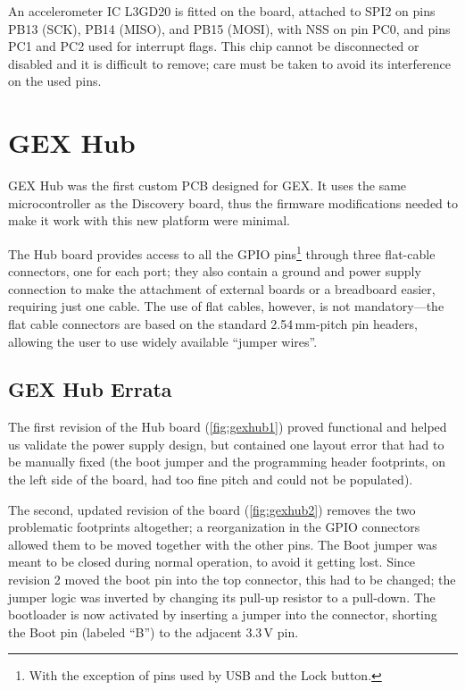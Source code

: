 An accelerometer \gls{IC} L3GD20 is fitted on the board, attached to SPI2 on pins PB13 (\gls{SCK}), PB14 (\gls{MISO}), and PB15 (\gls{MOSI}), with \gls{NSS} on pin PC0, and pins PC1 and PC2 used for interrupt flags. This chip cannot be disconnected or disabled and it is difficult to remove; care must be taken to avoid its interference on the used pins.

\section{GEX Hub}

GEX Hub was the first custom \gls{PCB} designed for GEX. It uses the same microcontroller as the Discovery board, thus the firmware modifications needed to make it work with this new platform were minimal.

The Hub board provides access to all the \gls{GPIO} pins\footnote{With the exception of pins used by USB and the Lock button.} through three flat-cable connectors, one for each port; they also contain a ground and power supply connection to make the attachment of external boards or a breadboard easier, requiring just one cable. The use of flat cables, however, is not mandatory---the flat cable connectors are based on the standard 2.54\,mm-pitch pin headers, allowing the user to use widely available ``jumper wires''.

\subsection{GEX Hub Errata}

The first revision of the Hub board (\cref{fig:gexhub1}) proved functional and helped us validate the power supply design, but contained one layout error that had to be manually fixed (the boot jumper and the programming header footprints, on the left side of the board, had too fine pitch and could not be populated).

The second, updated revision of the board (\cref{fig:gexhub2}) removes the two problematic footprints altogether; a reorganization in the \gls{GPIO} connectors allowed them to be moved together with the other pins. The Boot jumper was meant to be closed during normal operation, to avoid it getting lost. Since revision 2 moved the boot pin into the top connector, this had to be changed; the jumper logic was inverted by changing its pull-up resistor to a pull-down. The bootloader is now activated by inserting a jumper into the connector, shorting the Boot pin (labeled ``B'') to the adjacent 3.3\,V pin.


